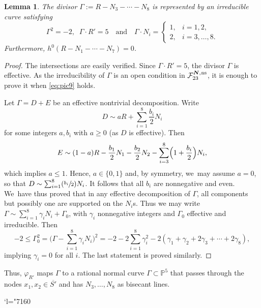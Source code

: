 \documentclass[11pt]{article}
\newcommand{\Changel}{\mathcode`l="7160}
\newcommand{\Psfrac}[2]{(\sfrac{#1}{#2})}
\newcommand{\quand}{\quad\text{and}\quad}
\newcommand{\ns}{{\mkern1mu\mathrm{ns}}}
\newcommand{\bN}{\boldsymbol{N}}
\theoremstyle{plain}
\newtheorem{lemma}[thm]{Lemma}
\theoremstyle{definition}
\newcommand\PP{{\mathbb P}}
\newcommand\F{{\mathcal F}}
\begin{document}
\begin{lemma} \label{lemma:Juve-15}
The divisor $
\Gamma:=R-N_3-\cdots-N_8
$
is represented by an irreducible curve satisfying
\[
 \Gamma^2=-2, \;\; \Gamma\cdot R'=5 \quand\Gamma \cdot N_i =
\begin{cases}
1, & i=1,2, \\
2, & i=3,\ldots,8.
\end{cases}
\]
Furthermore, $h^0(R-N_1-\cdots-N_7)=0$.
\end{lemma}

\begin{proof}
The intersections are easily verified. Since $\Gamma \cdot R'=5$, the divisor $\Gamma$ is effective.
As the irreducibility of $\Gamma$ is an open condition in $\F_{23}^{\bN,\ns}$, it is enough to prove it when \eqref{eq:pic9} holds.

Let $\Gamma=D+E$ be an effective nontrivial decomposition. Write
\[
D \sim aR+\sum_{i=1}^8 \frac{b_i}{2}N_i
\]
for some integers $a,b_i$ with $a \geq 0$ (as $D$ is effective). Then
\[
E \sim (1-a)R-\frac{b_1}{2}N_1-\frac{b_2}{2}N_2 -\sum_{i=3}^8 \Bigl(1+\frac{b_i}{2}\Bigr)N_i,
\]
which implies $a \leq 1$. Hence, $a \in \{0,1\}$ and, by symmetry, we~may assume $a=0$, so that $D \sim \sum_{i=1}^8 \Psfrac{b_i}{2}N_i$. It follows that all $b_i$ are nonnegative and even. We~have thus proved that in any effective decomposition of $\Gamma$, all components but possibly one are supported on the $N_i$s. Thus we may write $\Gamma \sim \sum_{i=1}^8 \gamma_iN_i+\Gamma_0$, with $\gamma_i$ nonnegative integers and $\Gamma_0$ effective and irreducible. Then
\[
 -2 \leq \Gamma_0^2=\biggl(\Gamma -\sum_{i=1}^8 \gamma_iN_i\biggr)^2=
-2-2\sum_{i=1}^8 \gamma_i^2-2(\gamma_1+\gamma_2+2\gamma_3+\cdots+2\gamma_8),
\]
implying $\gamma_i=0$ for all $i$. The last statement is proved similarly.
\end{proof}

Thus, $\varphi_{R'}$ maps $\Gamma$ to a rational normal curve $\Gamma\subset \PP^5$ that passes through the nodes $x_1,x_2\in \overline{S'}$ and has $N_3,\ldots,N_8$ as bisecant lines.

\Changel
\end{document}
